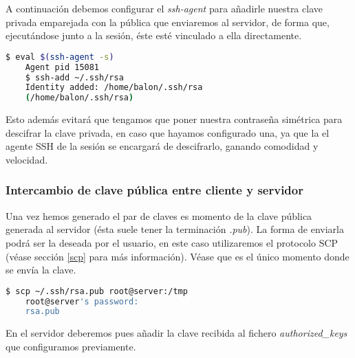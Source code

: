 \documentclass[a4paper, 11pt, titlepage]{article}
\begin{document}
        A continuación debemos configurar el \textit{ssh-agent} para añadirle nuestra 
        clave privada emparejada con la pública que enviaremos al servidor, de forma que,
        ejecutándose junto a la sesión, éste esté vinculado a ella directamente.

        \begin{lstlisting}[language=bash,basicstyle=\small]
    $ eval $(ssh-agent -s)
    Agent pid 15081
    $ ssh-add ~/.ssh/rsa
    Identity added: /home/balon/.ssh/rsa 
    (/home/balon/.ssh/rsa) \end{lstlisting}

        Esto además evitará que tengamos que poner nuestra contraseña simétrica 
        para descifrar la clave privada, en caso que hayamos configurado una, ya que la 
        el agente SSH de la sesión se encargará de descifrarlo, ganando comodidad y velocidad.

        \subsubsection{Intercambio de clave pública entre cliente y servidor} Una vez hemos 
        generado el par de claves es momento de la clave pública generada al servidor 
        (ésta suele tener la terminación \textit{.pub}). La forma de enviarla podrá ser 
        la deseada por el usuario, en este caso utilizaremos el protocolo SCP (véase 
        sección \ref{scp} para más información). Véase que es el único momento donde se 
        envía la clave.
        
        \begin{lstlisting}[language=bash]
    $ scp ~/.ssh/rsa.pub root@server:/tmp
    root@server's password:
    rsa.pub \end{lstlisting}

        En el servidor deberemos pues añadir la clave recibida al fichero \textit{authorized\_keys}
        que configuramos previamente.
        
\end{document}
